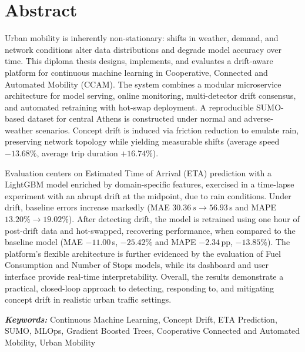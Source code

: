 \chapter*{Abstract}

Urban mobility is inherently non-stationary: shifts in weather, demand, and network conditions alter data distributions and degrade model accuracy over time.
This diploma thesis designs, implements, and evaluates a drift-aware platform for continuous machine learning in Cooperative, Connected and Automated Mobility (CCAM).
The system combines a modular microservice architecture for model serving, online monitoring, multi-detector drift consensus, and automated retraining with hot-swap deployment.
A reproducible SUMO-based dataset for central Athens is constructed under normal and adverse-weather scenarios.
Concept drift is induced via friction reduction to emulate rain, preserving network topology while yielding measurable shifts (average speed $-13.68\%$, average trip duration $+16.74\%$).

Evaluation centers on Estimated Time of Arrival (ETA) prediction with a LightGBM model enriched by domain-specific features, exercised in a time-lapse experiment with an abrupt drift at the midpoint, due to rain conditions.
Under drift, baseline errors increase markedly (MAE $30.36\,s \rightarrow 56.93$\,s and MAPE $13.20\% \rightarrow 19.02\%$).
After detecting drift, the model is retrained using one hour of post-drift data and hot-swapped, recovering performance, when compared to the baseline model (MAE $-11.00$\,s, $-25.42\%$ and MAPE $-2.34$\,pp, $-13.85\%$).
The platform's flexible architecture is further evidenced by the evaluation of Fuel Consumption and Number of Stops models, while its dashboard and user interface provide real-time interpretability.
Overall, the results demonstrate a practical, closed-loop approach to detecting, responding to, and mitigating concept drift in realistic urban traffic settings.

\textbf{\textit{Keywords:}}
Continuous Machine Learning, Concept Drift, ETA Prediction, SUMO, MLOps, Gradient Boosted Trees, Cooperative Connected and Automated Mobility, Urban Mobility

\cleardoublepage
